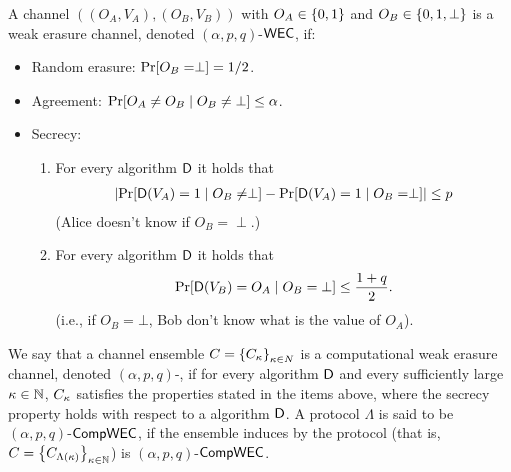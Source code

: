 \begin{definition}[\WEC]\label{def:WEC}
	A channel $((O_A,V_A), (O_B,V_B))$ with $O_A \in \set{0,1}$ and $O_B \in \set{0,1,\bot}$ is a {\sf weak erasure channel}, denoted $(\alpha,p,q)$-${\sf WEC}$, if:
	\begin{itemize}
		\item Random erasure: $\pr{O_B = \perp} = 1/2$.
		
		\item Agreement: $\pr{O_A\ne O_B\mid O_B\ne \bot}\le \alpha$.
		
		\item Secrecy:
		
		\begin{enumerate}
			\item For every algorithm $\mathsf{D}$ it holds that\label{WEC:item:A}
			\begin{align*}
				\size{\pr{\Dc(V_A) = 1 \mid O_B \neq \perp} - \pr{\Dc(V_A) = 1 \mid O_B = \perp}} \le p
			\end{align*}
			(Alice doesn't know if $O_B = \perp$.)
			
			\item For every algorithm $\mathsf{D}$ it holds that\label{WEC:item:B}
			\begin{align*}
				\pr{\Dc(V_B) = O_A \mid O_B=\bot} \leq \frac{1+q}{2}.
			\end{align*}
			(i.e., if $O_B=\bot$, Bob don't know what is the value of $O_A$).
			
			
		\end{enumerate}
	\end{itemize}
   We say that a channel ensemble $C=\set{C_\pk}_{\pk\in N}$ is a {\sf computational weak erasure channel}, denoted $(\alpha,p,q)$-\CompWEC, if for every \ppt algorithm $\mathsf{D}$ and every sufficiently large $\kappa\in{\mathbb{N}}$, $C_\kappa$ satisfies the properties stated in the items above, where the secrecy property holds with respect to a \ppt algorithm $\mathsf{D}$. A protocol $\Lambda$ is said to be $(\alpha,p,q)$-${\sf CompWEC}$, if the ensemble induces by the protocol (that is, $C=\set{C_{\Lambda(\pk)}}_{\pk\in\N}$) is $(\alpha,p,q)$-${\sf CompWEC}$.  
\end{definition}



